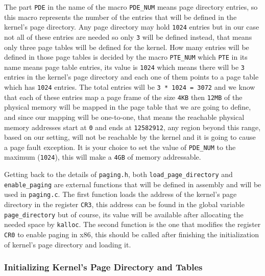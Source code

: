 The part \lstinline!PDE! in the name of the macro \lstinline!PDE_NUM!
means page directory entries, so this macro represents the number of the
entries that will be defined in the kernel's page directory. Any page
directory may hold \lstinline!1024! entries but in our case not all of
these entries are needed so only \lstinline!3! will be defined instead,
that means only three page tables will be defined for the kernel. How
many entries will be defined in those page tables is decided by the
macro \lstinline!PTE_NUM! which \lstinline!PTE! in its name means page
table entries, its value is \lstinline!1024! which means there will be
\lstinline!3! entries in the kernel's page directory and each one of
them points to a page table which has \lstinline!1024! entries. The
total entries will be \lstinline!3 * 1024 = 3072! and we know that each
of these entries map a page frame of the size \lstinline!4KB! then
\lstinline!12MB! of the physical memory will be mapped in the page table
that we are going to define, and since our mapping will be one-to-one,
that means the reachable physical memory addresses start at
\lstinline!0! and ends at \lstinline!12582912!, any region beyond this
range, based on our setting, will not be reachable by the kernel and it
is going to cause a page fault exception. It is your choice to set the
value of \lstinline!PDE_NUM! to the maximum (\lstinline!1024!), this
will make a \lstinline!4GB! of memory addressable.

Getting back to the details of \lstinline!paging.h!, both
\lstinline!load_page_directory! and \lstinline!enable_paging! are
external functions that will be defined in assembly and will be used in
\lstinline!paging.c!. The first function loads the address of the
kernel's page directory in the register \lstinline!CR3!, this address
can be found in the global variable \lstinline!page_directory! but of
course, its value will be available after allocating the needed space by
\lstinline!kalloc!. The second function is the one that modifies the
register \lstinline!CR0! to enable paging in x86, this should be called
after finishing the initialization of kernel's page directory and
loading it.

\subsubsection{Initializing Kernel's Page Directory and
Tables}\label{initializing-kernels-page-directory-and-tables}

